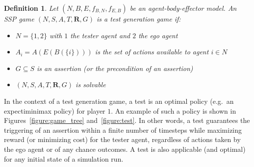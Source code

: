 \documentclass[10pt]{article}
\theoremstyle{plain}
\newtheorem{definition}{Definition}
\newcommand{\vect}[1]{\bm{#1}}
\begin{document}
%

\begin{definition}\label{definition:game}
    Let $(N, B, E, f_{B,N}, f_{E,B})$ be an agent-body-effector model.
    An SSP game $(N, S, A, T, \vect{R}, G)$ is a test generation game if:
    \begin{itemize}
        \item $N = \{ 1, 2 \}$ with $1$ the tester agent and $2$ the ego agent
        \item $A_{i} = A(E(B(\{ i \})))$ is the set of actions available to agent $i \in N$
        \item $G \subseteq S$ is an assertion (or the precondition of an assertion)
        \item $(N, S, A, T, \vect{R}, G)$ is solvable
    \end{itemize}
\end{definition}

In the context of a test generation game, a test is an optimal policy (e.g.\ an expectiminimax policy) for player $1$.
An example of such a policy is shown in Figures~\ref{figure:game_tree} and~\ref{figure:test}.
In other words, a test guarantees the triggering of an assertion within a finite number of timesteps while maximizing reward (or minimizing cost) for the tester agent, regardless of actions taken by the ego agent or of any chance outcomes.
A test is also applicable (and optimal) for any initial state of a simulation run.
\end{document}
